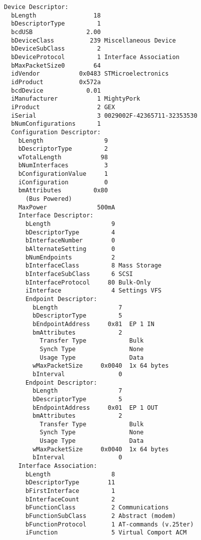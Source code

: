 \hspace*{-3em}
\begin{minipage}[t]{0.5\textwidth}\scriptsize
\begin{verbatim}
Device Descriptor:
  bLength                18
  bDescriptorType         1
  bcdUSB               2.00
  bDeviceClass          239 Miscellaneous Device
  bDeviceSubClass         2 
  bDeviceProtocol         1 Interface Association
  bMaxPacketSize0        64
  idVendor           0x0483 STMicroelectronics
  idProduct          0x572a 
  bcdDevice            0.01
  iManufacturer           1 MightyPork
  iProduct                2 GEX
  iSerial                 3 0029002F-42365711-32353530
  bNumConfigurations      1
  Configuration Descriptor:
    bLength                 9
    bDescriptorType         2
    wTotalLength           98
    bNumInterfaces          3
    bConfigurationValue     1
    iConfiguration          0 
    bmAttributes         0x80
      (Bus Powered)
    MaxPower              500mA
    Interface Descriptor:
      bLength                 9
      bDescriptorType         4
      bInterfaceNumber        0
      bAlternateSetting       0
      bNumEndpoints           2
      bInterfaceClass         8 Mass Storage
      bInterfaceSubClass      6 SCSI
      bInterfaceProtocol     80 Bulk-Only
      iInterface              4 Settings VFS
      Endpoint Descriptor:
        bLength                 7
        bDescriptorType         5
        bEndpointAddress     0x81  EP 1 IN
        bmAttributes            2
          Transfer Type            Bulk
          Synch Type               None
          Usage Type               Data
        wMaxPacketSize     0x0040  1x 64 bytes
        bInterval               0
      Endpoint Descriptor:
        bLength                 7
        bDescriptorType         5
        bEndpointAddress     0x01  EP 1 OUT
        bmAttributes            2
          Transfer Type            Bulk
          Synch Type               None
          Usage Type               Data
        wMaxPacketSize     0x0040  1x 64 bytes
        bInterval               0
    Interface Association:
      bLength                 8
      bDescriptorType        11
      bFirstInterface         1
      bInterfaceCount         2
      bFunctionClass          2 Communications
      bFunctionSubClass       2 Abstract (modem)
      bFunctionProtocol       1 AT-commands (v.25ter)
      iFunction               5 Virtual Comport ACM
\end{verbatim}
\end{minipage}\hspace{1em}
